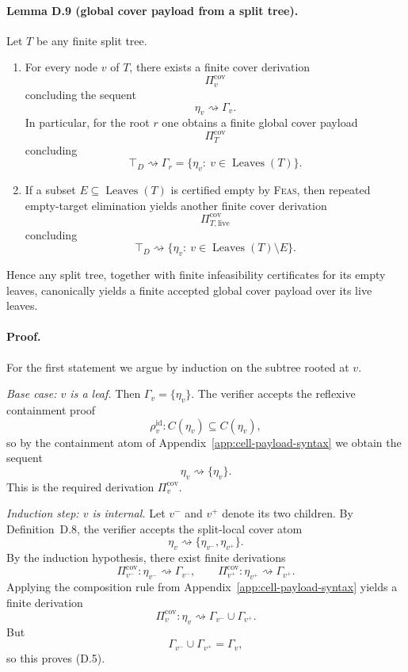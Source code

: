 \paragraph{Lemma D.9 (global cover payload from a split tree).}
Let $T$ be any finite split tree.
\begin{enumerate}
    \item For every node $v$ of $T$, there exists a finite cover derivation
    \[
    \Pi_v^{\mathrm{cov}}
    \]
    concluding the sequent
    \[
    \eta_v\rightsquigarrow \Gamma_v.
    \tag{D.5}
    \]
    In particular, for the root $r$ one obtains a finite global cover payload
    \[
    \Pi_T^{\mathrm{cov}}
    \]
    concluding
    \[
    \top_D\rightsquigarrow \Gamma_r
    =
    \{\eta_v:\ v\in \operatorname{Leaves}(T)\}.
    \tag{D.6}
    \]
    \item If a subset $E\subseteq \operatorname{Leaves}(T)$ is certified empty by \textsc{Feas}, then repeated empty-target elimination yields another finite cover derivation
    \[
    \Pi_{T,\mathrm{live}}^{\mathrm{cov}}
    \]
    concluding
    \[
    \top_D\rightsquigarrow \{\eta_v:\ v\in \operatorname{Leaves}(T)\setminus E\}.
    \tag{D.7}
    \]
\end{enumerate}
Hence any split tree, together with finite infeasibility certificates for its empty leaves, canonically yields a finite accepted global cover payload over its live leaves.

\paragraph{Proof.}
For the first statement we argue by induction on the subtree rooted at $v$.

\emph{Base case: $v$ is a leaf.}
Then $\Gamma_v=\{\eta_v\}$. The verifier accepts the reflexive containment proof
\[
 \rho_v^{\mathrm{id}}: C(\eta_v)\subseteq C(\eta_v),
\]
so by the containment atom of Appendix~\ref{app:cell-payload-syntax} we obtain the sequent
\[
 \eta_v\rightsquigarrow \{\eta_v\}.
\]
This is the required derivation $\Pi_v^{\mathrm{cov}}$.

\emph{Induction step: $v$ is internal.}
Let $v^-$ and $v^+$ denote its two children. By Definition~D.8, the verifier accepts the split-local cover atom
\[
 \eta_v\rightsquigarrow \{\eta_{v^-},\eta_{v^+}\}.
\]
By the induction hypothesis, there exist finite derivations
\[
 \Pi_{v^-}^{\mathrm{cov}}:
 \eta_{v^-}\rightsquigarrow \Gamma_{v^-},
 \qquad
 \Pi_{v^+}^{\mathrm{cov}}:
 \eta_{v^+}\rightsquigarrow \Gamma_{v^+}.
\]
Applying the composition rule from Appendix~\ref{app:cell-payload-syntax} yields a finite derivation
\[
 \Pi_v^{\mathrm{cov}}:
 \eta_v\rightsquigarrow \Gamma_{v^-}\cup \Gamma_{v^+}.
\]
But
\[
 \Gamma_{v^-}\cup \Gamma_{v^+}=\Gamma_v,
\]
so this proves (D.5).

